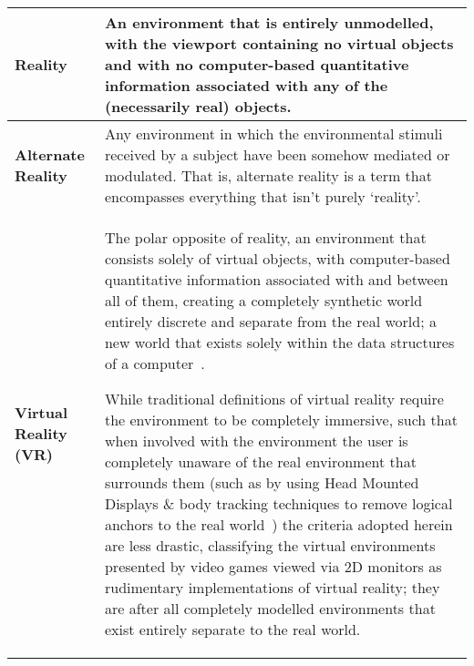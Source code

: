 \begin{center}
\begin{longtable}{| l | p{10cm} |}

\hline	
	
		
\textbf{Reality} & An environment that is entirely unmodelled, with the viewport containing no virtual objects and with no computer-based quantitative information associated with any of the (necessarily real) objects. \\
		
\hline
		

\textbf{Alternate Reality} & Any environment in which the environmental stimuli received by a subject have been somehow mediated or modulated. That is, alternate reality is a term that encompasses everything that isn't purely `reality'. \\

\hline
		
		
\textbf{Virtual Reality (VR)} & The polar opposite of reality, an environment that consists solely of virtual objects, with computer-based quantitative information associated with and between all of them, creating a completely synthetic world entirely discrete and separate from the real world; a new world that exists solely within the data structures of a computer~\cite{Milgram1994, Milgram1999, Want2009}.

While traditional definitions of virtual reality require the environment to be completely immersive, such that when involved with the environment the user is completely unaware of the real environment that surrounds them (such as by using Head Mounted Displays \& body tracking techniques to remove logical anchors to the real world~\cite{Druck2006}) the criteria adopted herein are less drastic, classifying the virtual environments presented by video games viewed via 2D monitors as rudimentary implementations of virtual reality; they are after all completely modelled environments that exist entirely separate to the real world. \\
		
\hline
		

\end{longtable}
\end{center}
